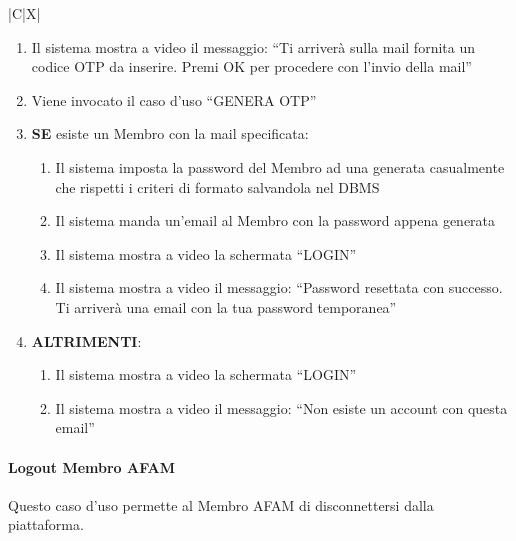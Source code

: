 \begin{tabularx}{\textwidth}{|C|X|}
{\begin{enumerate}
    \item Il sistema mostra a video il messaggio: ``Ti arriver\`a sulla mail fornita un codice OTP da inserire. Premi OK per procedere con l'invio della mail''
    \item Viene invocato il caso d'uso ``GENERA OTP''
    \item \textbf{SE} esiste un Membro con la mail specificata:
    \begin{enumerate}
        \item Il sistema imposta la password del Membro ad una generata casualmente che rispetti i criteri di formato salvandola nel DBMS
        \item Il sistema manda un'email al Membro con la password appena generata
        \item Il sistema mostra a video la schermata ``LOGIN''
        \item Il sistema mostra a video il messaggio: ``Password resettata con successo. Ti arriver\`a una email con la tua password temporanea''
    \end{enumerate}
    \item \textbf{ALTRIMENTI}:
    \begin{enumerate}
        \item Il sistema mostra a video la schermata ``LOGIN''
        \item Il sistema mostra a video il messaggio: ``Non esiste un account con questa email''
    \end{enumerate}    
\end{enumerate}
}
\hline
\end{tabularx}

\clearpage

\paragraph{Logout Membro AFAM}
\par{\noindent Questo caso d'uso permette al Membro AFAM di disconnettersi dalla piattaforma.}

